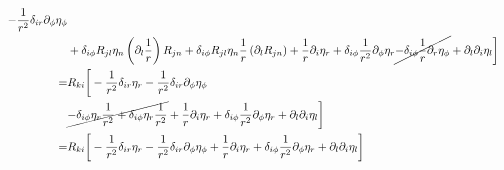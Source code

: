 \documentclass[aps,prl,preprint]{revtex4-2}
\begin{document}
\begin{align}
    -\frac{1}{r^2}\delta_{ir}\partial_\phi\eta_\phi\nonumber                                                         \\
      & +\delta_{i\phi}R_{jl}\eta_n\left(\partial_l\frac{1}{r}\right)R_{jn}
    +\delta_{i\phi}R_{jl}\eta_n\frac{1}{r}\left(\partial_lR_{jn}\right) + \frac{1}{r}\partial_i\eta_r
    +\delta_{i\phi}\frac{1}{r^2}\partial_\phi\eta_r\cancel{-\delta_{i\phi}\frac{1}{r}\partial_r\eta_\phi}
    + \partial_l\partial_i\eta_l\bigg]\nonumber                                                                      \\
    = & R_{ki}\bigg[-\frac{1}{r^2}\delta_{ir}\eta_r
    -\frac{1}{r^2}\delta_{ir}\partial_\phi\eta_\phi\nonumber                                                         \\
      & \cancel{-\delta_{i\phi}\eta_r\frac{1}{r^2} +\delta_{i\phi}\eta_r\frac{1}{r^2}} + \frac{1}{r}\partial_i\eta_r
        +\delta_{i\phi}\frac{1}{r^2}\partial_\phi\eta_r
    + \partial_l\partial_i\eta_l\bigg]\nonumber                                                                      \\
    = & R_{ki}\bigg[-\frac{1}{r^2}\delta_{ir}\eta_r
        -\frac{1}{r^2}\delta_{ir}\partial_\phi\eta_\phi + \frac{1}{r}\partial_i\eta_r
        +\delta_{i\phi}\frac{1}{r^2}\partial_\phi\eta_r + \partial_l\partial_i\eta_l\bigg]
\end{align}
\end{document}
